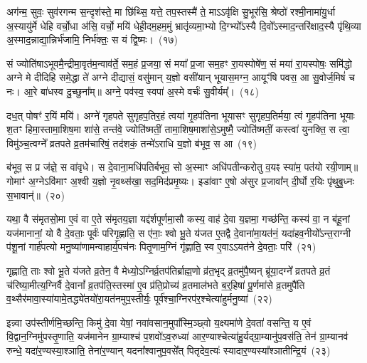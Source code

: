 {\anuvakamend[{दक्षि॑णायां द्वि॒ष्मो विष्णो॒रेका॒न्नत्रि॒ꣳ॒शच्च॑}]}

अग॑न्म॒ सुवः॒ सुव॑रगन्म स॒न्दृश॑स्ते॒ मा छि॑थ्सि॒ यत्ते॒ तप॒स्तस्मै॑ ते॒ मा\-ऽऽ\-वृ॑क्षि सु॒भूर॑सि॒ श्रेष्ठो॑ रश्मी॒नामा॑यु॒र्धा अ॒स्यायु॑र्मे धेहि वर्चो॒धा अ॑सि॒ वर्चो॒ मयि॑ धेही॒दम॒हम॒मुं भ्रातृ॑व्यमा॒भ्यो दि॒ग्भ्यो᳚\-ऽस्यै दि॒वो᳚\-ऽस्माद॒न्तरि॑क्षाद॒स्यै पृ॑थि॒व्या अ॒स्मा\-द॒न्नाद्या॒न्निर्भ॑जामि॒ निर्भ॑क्तः॒ स यं द्वि॒ष्मः।~(१७)\ip

सं ज्योति॑षा\-ऽभूवमै॒न्द्रीमा॒वृत॑\-म॒न्वाव॑र्ते॒ सम॒हं प्र॒जया॒ सं मया᳚ प्र॒जा सम॒हꣳ रा॒यस्पोषे॑ण॒ सं मया॑ रा॒यस्पोषः॒ समि॑द्धो अग्ने मे दीदिहि समे॒द्धा ते॑ अग्ने दीद्यासं॒ वसु॑मान् य॒ज्ञो वसी॑यान् भूयास॒मग्न॒ आयूꣳ॑षि पवस॒ आ सु॒वोर्ज॒मिषं॑ च नः। आ॒रे बा॑धस्व दु॒च्छुना᳚म्॥ अग्ने॒ पव॑स्व॒ स्वपा॑ अ॒स्मे वर्चः॑ सु॒वीर्यम्᳚।~(१८)\ip

दध॒त् पोषꣳ॑ र॒यिं मयि॑। अग्ने॑ गृहपते सुगृहप॒तिर॒हं त्वया॑ गृ॒हप॑तिना भूयासꣳ सुगृहप॒तिर्मया॒ त्वं गृ॒हप॑तिना भूयाः श॒तꣳ हिमा॒स्तामा॒शिष॒मा शा॑से॒ तन्त॑वे॒ ज्योति॑ष्मतीं॒ तामा॒शिष॒माशा॑से॒\-ऽमुष्मै॒ ज्योति॑ष्मतीं॒ कस्त्वा॑ युनक्ति॒ स त्वा॒ विमु॑ञ्च॒त्वग्ने᳚ व्रतपते व्र॒तम॑चारिषं॒ तद॑शकं॒ तन्मे॑\-ऽराधि य॒ज्ञो ब॑भूव॒ स आ~(१९)\ip

ब॑भूव॒ स प्र ज॑ज्ञे॒ स वा॑वृधे। स दे॒वाना॒मधि॑\-पतिर्बभूव॒ सो अ॒स्माꣳ अधि॑पतीन्करोतु व॒यꣴ स्या॑म॒ पत॑यो रयी॒णाम्॥ गोमाꣳ॑ अ॒ग्ने\-ऽवि॑माꣳ अ॒श्वी य॒ज्ञो नृ॒वथ्स॑खा॒ सद॒मिद॑प्रमृ॒ष्यः। इडा॑वाꣳ ए॒षो अ॑सुर प्र॒जावा᳚न् दी॒र्घो र॒यिः पृ॑थुबु॒ध्नः स॒भावान्॑॥~(२०)\ip

{\anuvakamend[{द्वि॒ष्मः सु॒वीर्य॒ꣳ॒ स आ पञ्च॑त्रिꣳशच्च}]}

यथा॒ वै स॑मृतसो॒मा ए॒वं वा ए॒ते स॑मृतय॒ज्ञा यद्द॑र्\mbox{}श\-पूर्ण\-मा॒सौ कस्य॒ वाह॑ दे॒वा य॒ज्ञमा॒ गच्छ॑न्ति॒ कस्य॑ वा॒ न ब॑हू॒नां यज॑मानानां॒ यो वै दे॒वताः॒ पूर्वः॑ परिगृ॒ह्णाति॒ स ए॑नाः॒ श्वो भू॒ते य॑जत ए॒तद्वै दे॒वाना॑मा॒यत॑नं॒ यदा॑हव॒नीयो᳚\-ऽन्त॒राग्नी प॑शू॒नां गार्\mbox{}ह॑पत्यो मनु॒ष्या॑णामन्वाहार्य॒पच॑नः पितृ॒णाम॒ग्निं गृ॑ह्णाति॒ स्व ए॒वा\-ऽऽयत॑ने दे॒वताः॒ परि॑~(२१)\ip

गृह्णाति॒ ताः श्वो भू॒ते य॑जते व्र॒तेन॒ वै मेध्यो॒\-ऽग्निर्व्र॒तप॑तिर्ब्राह्म॒णो व्र॑त॒भृद् व्र॒तमु॑पै॒ष्यन् ब्रू॑या॒दग्ने᳚ व्रतपते व्र॒तं च॑रिष्या॒मीत्य॒ग्निर्वै दे॒वानां᳚ व्र॒तप॑ति॒स्तस्मा॑ ए॒व प्र॑ति॒प्रोच्य॑ व्र॒तमाल॑भते ब॒र्॒\mbox{}हिषा॑ पू॒र्णमा॑से व्र॒तमुपै॑ति व॒थ्सैर॑मा\-वा॒स्या॑यामे॒तद्ध्ये॑तयो॑\-रा॒यत॑न\-मुप॒स्तीर्यः॒ पूर्व॑श्चा॒ग्निरप॑र॒\-श्चेत्या॑हुर्मनु॒ष्या॑~(२२)\ip

इन्न्वा उप॑स्तीर्णमि॒च्छन्ति॒ किमु॑ दे॒वा येषां॒ नवा॑वसान॒\-मुपा᳚स्मि॒ञ्छ्वो य॒क्ष्यमा॑णे दे॒वता॑ वसन्ति॒ य ए॒वं वि॒द्वान॒ग्निमु॑पस्तृ॒णाति॒ यज॑मानेन ग्रा॒म्याश्च॑ प॒शवो॑\-ऽव॒रुध्या॑ आर॒ण्याश्चेत्या॑\-हु॒र्यद्ग्रा॒म्यानु॑प॒\-वस॑ति॒ तेन॑ ग्रा॒म्यानव॑ रुन्धे॒ यदा॑र॒ण्यस्या॒श्ञाति॒ तेना॑र॒ण्यान् यदना᳚श्वानुप॒वसे᳚त् पितृदेव॒त्यः॑ स्यादा\-र॒ण्यस्या᳚श्ञातीन्द्रि॒यं~(२३)\ip

